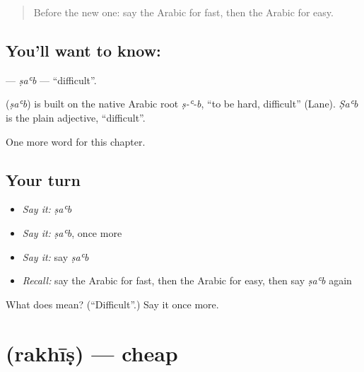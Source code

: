 \label{lesson:AR-C83-sab}



\begin{quote}
Before the new one: say the Arabic for fast, then the Arabic for easy.
\end{quote}

\subsection*{You'll want to know: }
\textbf{} — \emph{ṣaʿb} — \textquotedblleft{}difficult\textquotedblright{}.

\begin{cousinweb}
\textbf{} (\emph{ṣaʿb}) is built on the native Arabic root \emph{ṣ-ʿ-b}, \textquotedblleft{}to be hard, difficult\textquotedblright{} (Lane). \emph{Ṣaʿb} is the plain adjective, \textquotedblleft{}difficult\textquotedblright{}.
\end{cousinweb}

\begin{grammarlens}[title={What you've built}]
One more word for this chapter.
\end{grammarlens}

\subsection*{Your turn}
\begin{itemize}
\raggedright
  \item \emph{Say it:} \emph{ṣaʿb}
  \item \emph{Say it:} \emph{ṣaʿb}, once more
  \item \emph{Say it:} say \emph{ṣaʿb}
  \item \emph{Recall:} say the Arabic for fast, then the Arabic for easy, then say \emph{ṣaʿb} again
\end{itemize}

\begin{tcolorbox}[breakable,colback=teal!4,colframe=teal!35!black,title={Before you move on}]
What does  mean? (\textquotedblleft{}Difficult\textquotedblright{}.) Say it once more.
\end{tcolorbox}
\section[\texorpdfstring{\ar{رخيص} (rakhīṣ)}{رخيص (rakhīṣ)}]{ (rakhīṣ) — cheap}

\label{lesson:AR-C83-rakhis}



